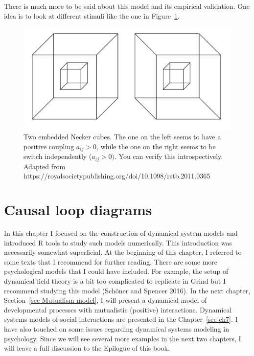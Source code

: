 \documentclass[
  a4paper,
  DIV=11,
  numbers=noendperiod]{scrreprt}
\begin{document}
There is much more to be said about this model and its empirical
validation. One idea is to look at different stimuli like the one in
Figure~\ref{fig-ch4n-img20-old-68}.

\begin{figure}

{\centering \includegraphics{media/ch4n/ch4n-20__figure69.png}

}

\caption{\label{fig-ch4n-img20-old-68}Two embedded Necker cubes. The one
on the left seems to have a positive coupling \(a_{ij} > 0\), while the
one on the right seems to be switch independently (\(a_{ij} > 0)\). You
can verify this introspectively. Adapted from
https://royalsocietypublishing.org/doi/10.1098/rstb.2011.0365}

\end{figure}

\hypertarget{sec-Causal-loop-diagrams}{%
\section{Causal loop diagrams}\label{sec-Causal-loop-diagrams}}

In this chapter I focused on the construction of dynamical system models
and introduced R tools to study such models numerically. This
introduction was necessarily somewhat superficial. At the beginning of
this chapter, I referred to some texts that I recommend for further
reading. There are some more psychological models that I could have
included. For example, the setup of dynamical field theory is a bit too
complicated to replicate in Grind but I recommend studying this model
(Schöner and Spencer 2016). In the next chapter,
Section~\ref{sec-Mutualism-model}, I will present a dynamical model of
developmental processes with mutualistic (positive) interactions.
Dynamical systems models of social interactions are presented in the
Chapter~\ref{sec-ch7}. I have also touched on some issues regarding
dynamical systems modeling in psychology. Since we will see several more
examples in the next two chapters, I will leave a full discussion to the
Epilogue of this book.
\end{document}
